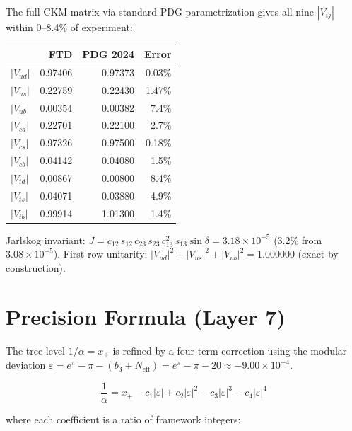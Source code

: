 \documentclass[12pt]{article}
\theoremstyle{definition}
\theoremstyle{remark}
\begin{document}
\noindent The full CKM matrix via standard PDG parametrization gives all nine $|V_{ij}|$
within 0--8.4\% of experiment:

\begin{center}\small
\begin{tabular}{@{}lrrr@{}}
\toprule
& \textbf{FTD} & \textbf{PDG 2024} & \textbf{Error} \\
\midrule
$|V_{ud}|$ & 0.97406 & 0.97373 & 0.03\% \\
$|V_{us}|$ & 0.22759 & 0.22430 & 1.47\% \\
$|V_{ub}|$ & 0.00354 & 0.00382 & 7.4\% \\
$|V_{cd}|$ & 0.22701 & 0.22100 & 2.7\% \\
$|V_{cs}|$ & 0.97326 & 0.97500 & 0.18\% \\
$|V_{cb}|$ & 0.04142 & 0.04080 & 1.5\% \\
$|V_{td}|$ & 0.00867 & 0.00800 & 8.4\% \\
$|V_{ts}|$ & 0.04071 & 0.03880 & 4.9\% \\
$|V_{tb}|$ & 0.99914 & 1.01300 & 1.4\% \\
\bottomrule
\end{tabular}
\end{center}

\noindent Jarlskog invariant: $J = c_{12}\,s_{12}\,c_{23}\,s_{23}\,c_{13}^2\,s_{13}\sin\delta = 3.18\times 10^{-5}$
(3.2\% from $3.08\times 10^{-5}$).
First-row unitarity: $|V_{ud}|^2 + |V_{us}|^2 + |V_{ub}|^2 = 1.000000$ (exact by construction).

\section{Precision Formula (Layer 7)}

\noindent The tree-level $1/\alpha = x_+$ is refined by a four-term correction using
the modular deviation $\varepsilon = e^\pi - \pi - (b_3 + N_\text{eff})
= e^\pi - \pi - 20 \approx -9.00\times 10^{-4}$.

\begin{equation}
\boxed{\frac{1}{\alpha} = x_+ - c_1|\varepsilon| + c_2|\varepsilon|^2
- c_3|\varepsilon|^3 - c_4|\varepsilon|^4}
\label{eq:precision}
\end{equation}

\noindent where each coefficient is a ratio of framework integers:
\end{document}
